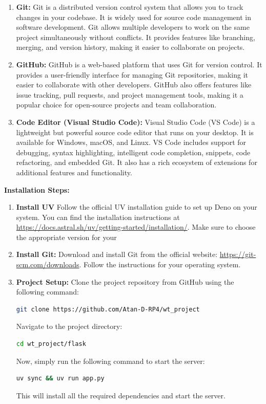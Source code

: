 \begin{enumerate}
    \item \textbf{Git:}
    Git is a distributed version control system that allows you to track
    changes in your codebase. It is widely used for source code management in
    software development. Git allows multiple developers to work on the same
    project simultaneously without conflicts. It provides features like
    branching, merging, and version history, making it easier to collaborate on
    projects.

    \item \textbf{GitHub:}
    GitHub is a web-based platform that uses Git for version control. It
    provides a user-friendly interface for managing Git repositories, making it
    easier to collaborate with other developers. GitHub also offers features
    like issue tracking, pull requests, and project management tools, making it
    a popular choice for open-source projects and team collaboration.

    \item \textbf{Code Editor (Visual Studio Code):}
    Visual Studio Code (VS Code) is a lightweight but powerful source code
    editor that runs on your desktop. It is available for Windows, macOS, and
    Linux. VS Code includes support for debugging, syntax highlighting,
    intelligent code completion, snippets, code refactoring, and embedded
    Git. It also has a rich ecosystem of extensions for additional features
    and functionality.
\end{enumerate}

\textbf{Installation Steps:}
\begin{enumerate}
    \item \textbf{Install UV}
    Follow the official UV installation guide to set up Deno on your system.
    You can find the installation instructions at
    \url{https://docs.astral.sh/uv/getting-started/installation/}. Make sure to choose the appropriate version for your

    \item \textbf{Install Git:}
    Download and install Git from the official website:
    \url{https://git-scm.com/downloads}. Follow the instructions for your
    operating system.

    \item \textbf{Project Setup:}
    Clone the project repository from GitHub using the following command:
    \begin{lstlisting}[language=bash]
        git clone https://github.com/Atan-D-RP4/wt_project
    \end{lstlisting}
    Navigate to the project directory:
    \begin{lstlisting}[language=bash]
        cd wt_project/flask
    \end{lstlisting}
    Now, simply run the following command to start the server:
    \begin{lstlisting}[language=bash]
        uv sync && uv run app.py
    \end{lstlisting}
    This will install all the required dependencies and start the server.
\end{enumerate}

